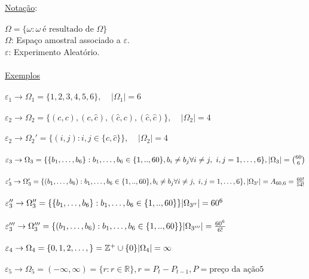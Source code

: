 \documentclass[a4paper,12pt]{article}
\begin{document}
\underline{Notação}:\\
\\
$\Omega=\{\omega:\omega \ \text{é resultado de } \Omega\}$\\
$\Omega$: Espaço amostral associado a $\varepsilon$.\\
$\varepsilon$: Experimento Aleatório.\\
\\
\underline{Exemplos}\\
\\
$\varepsilon_1 \rightarrow \Omega_1=\{1,2,3,4,5,6\}, \ \ \ \ \ |\Omega_1|=6 $\\
\\
$\varepsilon_2 \rightarrow \Omega_2=\{(c,c),(c,\hat{c}),(\hat{c},c),(\hat{c},\hat{c})\},  \ \ \ \ \ |\Omega_2|=4 $\\
\\
$\varepsilon_2 \rightarrow \Omega_2'=\{(i,j): i,j \in \{c,\hat{c}\}\}, \ \ \ \ \ |\Omega_2|=4  $\\
\\
$\varepsilon_3 \rightarrow \Omega_3=\{\{b_1,\dots,b_6\}: b_1,\dots,b_6 \in \{1,..,60\},b_i\ne b_j \forall i\ne j, \ i,j =1,\ldots,6\},\\
|\Omega_3| = \binom{60}{6} 
 $\\
 \\
$\varepsilon_3' \rightarrow \Omega_3'=\{(b_1,\dots,b_6): b_1,\dots,b_6 \in \{1,..,60\},b_i\ne b_j \forall i\ne j, \ i,j =1,\ldots,6\},\\
|\Omega_{3'}| = A_{60,6} = \frac{60!}{54!}
$\\
 \\
$\varepsilon_3'' \rightarrow \Omega_3''=\{\{b_1,\dots,b_6\}: b_1,\dots,b_6 \in \{1,..,60\}\}\\
|\Omega_{3''}| = 60^6
$\\
 \\
$\varepsilon_3''' \rightarrow \Omega_3'''=\{(b_1,\dots,b_6): b_1,\dots,b_6 \in \{1,..,60\}\}\\
|\Omega_{3'''}| = \frac{60^6}{6!}
$\\
 \\
$\varepsilon_4 \rightarrow \Omega_4=\{0,1,2,\ldots,\} = \mathbb{Z^+}\cup \{0\}\\
|\Omega_{4}| = \infty
$\\
 \\
$\varepsilon_5 \rightarrow \Omega_5=(-\infty,\infty)=\{r:r\in \mathbb{R} \}, r=P_t-P_{t-1}, P=\text{preço da ação}5
$\\
\end{document}
